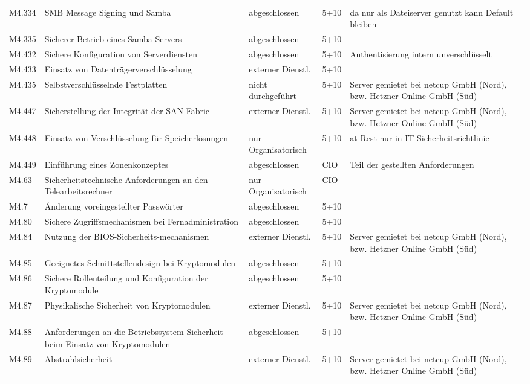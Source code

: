 \begin{longtable}{lp{3.7cm}p{3cm}lp{3.8cm}}
M4.334 & SMB Message Signing und Samba & abgeschlossen & 5+10 & da nur als Dateiserver genutzt kann Default bleiben \\
M4.335 &  Sicherer Betrieb eines Samba-Servers & abgeschlossen & 5+10 &  \\
M4.432 & Sichere Konfiguration von Serverdiensten & abgeschlossen & 5+10 & Authentisierung intern unverschlüsselt \\
M4.433 & Einsatz von Datenträgerverschlüsselung & externer Dienstl. & 5+10 &  \\
M4.435 & Selbstverschlüsselnde Festplatten & nicht durchgeführt & 5+10 & Server gemietet bei netcup GmbH (Nord), bzw. Hetzner Online GmbH (Süd) \\
M4.447 & Sicherstellung der Integrität der SAN-Fabric & externer Dienstl. & 5+10 & Server gemietet bei netcup GmbH (Nord), bzw. Hetzner Online GmbH (Süd) \\
M4.448 & Einsatz von Verschlüsselung für Speicherlösungen & nur Organisatorisch & 5+10 & at Rest nur in IT Sicherheitsrichtlinie \\
M4.449 & Einführung eines Zonenkonzeptes & abgeschlossen & CIO & Teil der gestellten Anforderungen \\
M4.63 & Sicherheitstechnische Anforderungen an den Telearbeitsrechner & nur Organisatorisch & CIO &  \\
M4.7 & Änderung voreingestellter Passwörter & abgeschlossen & 5+10 &  \\
M4.80 & Sichere Zugriffsmechanismen bei Fernadministration & abgeschlossen & 5+10 &  \\
M4.84 & Nutzung der BIOS-Sicherheits-mechanismen & externer Dienstl. & 5+10 & Server gemietet bei netcup GmbH (Nord), bzw. Hetzner Online GmbH (Süd) \\
M4.85 & Geeignetes Schnittstellendesign bei Kryptomodulen & abgeschlossen & 5+10 &  \\
M4.86 & Sichere Rollenteilung und Konfiguration der Kryptomodule & abgeschlossen & 5+10 &  \\
M4.87 & Physikalische Sicherheit von Kryptomodulen & externer Dienstl. & 5+10 & Server gemietet bei netcup GmbH (Nord), bzw. Hetzner Online GmbH (Süd) \\
M4.88 & Anforderungen an die Betriebssystem-Sicherheit beim Einsatz von Kryptomodulen & abgeschlossen & 5+10 &  \\
M4.89 & Abstrahlsicherheit & externer Dienstl. & 5+10 & Server gemietet bei netcup GmbH (Nord), bzw. Hetzner Online GmbH (Süd) \\

\end{longtable}
